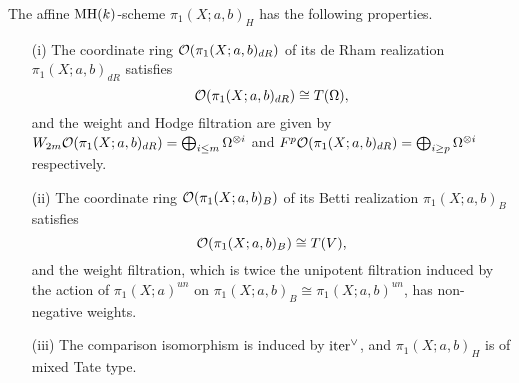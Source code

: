 \begin{prop}\label{prop:hodgeactualbasepoints}
The affine $\textnormal{MH}(k)$-scheme $\pi_1(X;a,b)_H$ has the following properties. 
\begin{itemize}
\item[(i)] The coordinate ring $\mathcal{O}(\pi_1(X;a,b)_{dR})$ of its de Rham realization $\pi_1(X;a,b)_{dR}$ satisfies
$$\mathcal{O}(\pi_1(X;a,b)_{dR})\cong T(\Omega),$$
and the weight and Hodge filtration are given by $W_{2m}\mathcal{O}(\pi_1(X;a,b)_{dR})=\bigoplus_{i\leq m}\Omega^{\otimes i}$  and $F^p\mathcal{O}(\pi_1(X;a,b)_{dR})=\bigoplus_{i\geq p}\Omega^{\otimes i}$ respectively. 
\item[(ii)] The coordinate ring $\mathcal{O}(\pi_1(X;a,b)_{B})$ of its Betti realization $\pi_1(X;a,b)_{B}$ satisfies
$$\mathcal{O}(\pi_1(X;a,b)_{B})\cong T(V),$$
and the weight filtration, which is twice the unipotent filtration induced by the action of $\pi_1(X;a)^{un}$ on $\pi_1(X;a,b)_B\cong \pi_1(X;a,b)^{un}$, has non-negative weights. 
\item[(iii)] The comparison isomorphism is induced by $\mathrm{iter}^{\vee}$, and $\pi_1(X;a,b)_H$ is of mixed Tate type.
\end{itemize}
\end{prop}
